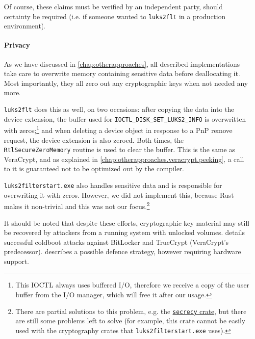 Of course, these claims must be verified by an independent party, should certainty be required (i.e. if someone wanted to \texttt{luks2flt} in a production environment).

\paragraph{Privacy}
As we have discussed in \autoref{chap:otherapproaches}, all described implementations take care to overwrite memory containing sensitive data before deallocating it. Most importantly, they all zero out any cryptographic keys when not needed any more.

\texttt{luks2flt} does this as well, on two occasions: after copying the data into the device extension, the buffer used for \texttt{IOCTL\_DISK\_SET\_LUKS2\_INFO} is overwritten with zeros;\footnote{\label{fn:ourapproach.security.zeroioctlbuffer} This IOCTL always uses buffered I/O, therefore we receive a copy of the user buffer from the I/O manager, which will free it after our usage.} and when deleting a device object in response to a PnP remove request, the device extension is also zeroed. Both times, the \texttt{RtlSecureZeroMemory} routine is used to clear the buffer. This is the same as VeraCrypt, and as explained in \autoref{chap:otherapproaches.veracrypt.peeking}, a call to it is guaranteed not to be optimized out by the compiler.

\texttt{luks2filterstart.exe} also handles sensitive data and is responsible for overwriting it with zeros. However, we did not implement this, because Rust makes it non-trivial and this was not our focus.\footnote{\label{fn:ourapproach.security.secrecycrate} There are partial solutions to this problem, e.g. the \href{https://crates.io/crates/secrecy}{\texttt{secrecy} crate}, but there are still some problems left to solve (for example, this crate cannot be easily used with the cryptography crates that \texttt{luks2filterstart.exe} uses).}

It should be noted that despite these efforts, cryptographic key material may still be recovered by attackers from a running system with unlocked volumes. \cite{Halderman2008} details successful coldboot attacks against BitLocker and TrueCrypt (VeraCrypt's predecessor). \cite{Guan2018} describes a possible defence strategy, however requiring hardware support.